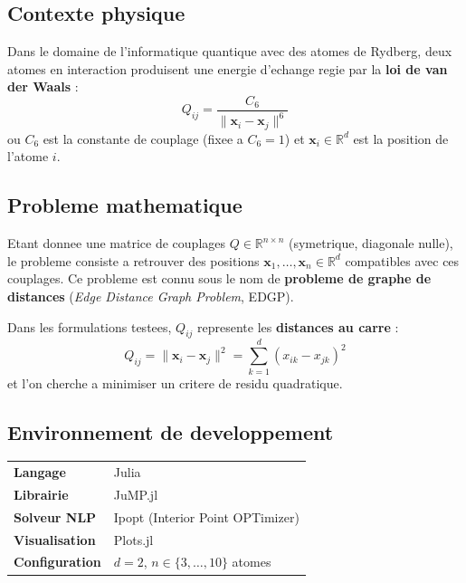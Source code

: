 \documentclass[12pt,a4paper]{article}
\begin{document}
\subsection{Contexte physique}

Dans le domaine de l'informatique quantique avec des atomes de Rydberg,
deux atomes en interaction produisent une energie d'echange regie par la
\textbf{loi de van der Waals} :
\[
  Q_{ij} = \frac{C_6}{\|\mathbf{x}_i - \mathbf{x}_j\|^6}
\]
ou $C_6$ est la constante de couplage (fixee a $C_6 = 1$) et
$\mathbf{x}_i \in \mathbb{R}^d$ est la position de l'atome $i$.

\subsection{Probleme mathematique}

Etant donnee une matrice de couplages $Q \in \mathbb{R}^{n \times n}$
(symetrique, diagonale nulle), le probleme consiste a retrouver des
positions $\mathbf{x}_1, \ldots, \mathbf{x}_n \in \mathbb{R}^d$
compatibles avec ces couplages.  Ce probleme est connu sous le nom de
\textbf{probleme de graphe de distances}
(\textit{Edge Distance Graph Problem}, EDGP).

Dans les formulations testees, $Q_{ij}$ represente les
\textbf{distances au carre} :
\[
  Q_{ij} = \|\mathbf{x}_i - \mathbf{x}_j\|^2
         = \sum_{k=1}^d (x_{ik} - x_{jk})^2
\]
et l'on cherche a minimiser un critere de residu quadratique.

\subsection{Environnement de developpement}

\begin{tcolorbox}[
  enhanced, colback=softgray, colframe=navyblue!40,
  arc=4pt, boxrule=0.6pt, left=10pt, right=10pt]
  \begin{tabular}{ll}
    \textbf{Langage}              & Julia \\
    \textbf{Librairie}            & JuMP.jl \\
    \textbf{Solveur NLP}          & Ipopt (Interior Point OPTimizer) \\
    \textbf{Visualisation}        & Plots.jl \\
    \textbf{Configuration}        & $d = 2$, $n \in \{3,\ldots,10\}$ atomes \\
  \end{tabular}
\end{tcolorbox}
\end{document}
